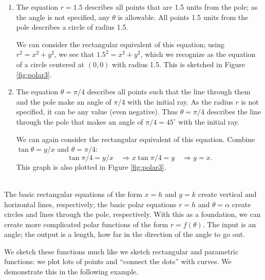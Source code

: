 {\begin{enumerate}
\item		The equation $r=1.5$ describes all points that are 1.5 units from the pole; as the angle is not specified, any $\theta$ is allowable. All points 1.5 units from the pole describes a circle of radius 1.5.

We can consider the rectangular equivalent of this equation; using $r^2=x^2+y^2$, we see that $1.5^2=x^2+y^2$, which we recognize as the equation of a circle centered at $(0,0)$ with radius 1.5. This is sketched in Figure \ref{fig:polar3}.

\item		The equation $\theta = \pi/4$ describes all points such that the line through them and the pole make an angle of $\pi/4$ with the initial ray. As the radius $r$ is not specified, it can be any value (even negative). Thus $\theta = \pi/4$ describes the line through the pole that makes an angle of $\pi/4 = 45^\circ$ with the initial ray.

We can again consider the rectangular equivalent of this equation. Combine $\tan \theta =y/x$ and $\theta =\pi/4$:
$$\tan \pi/4 = y/x \quad \Rightarrow x\tan \pi/4 = y \quad \Rightarrow y = x.$$ 
This graph is also plotted in Figure \ref{fig:polar3}.
\end{enumerate}
\baselineskip
}\\

The basic rectangular equations of the form $x=h$ and $y=k$ create vertical and horizontal lines, respectively; the basic polar equations $r= h$ and $\theta =\alpha$ create circles and lines through the pole, respectively. With this as a foundation, we can create more complicated polar functions of the form $r=f(\theta)$. The input is an angle; the output is a length, how far in the direction of the angle to go out.

We sketch these functions much like we sketch rectangular and parametric functions: we plot lots of points and ``connect the dots'' with curves. We demonstrate this in the following example.\\

